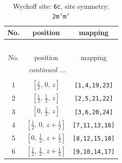 \documentclass[fleqn,8pt]{jsarticle}
\begin{document}
\renewcommand{\arraystretch}{1.2}
\begin{longtable}{ccc}
\caption{Wyckoff site: {\tt 6c}, site symmetry: {\tt 2m'm'}}
 \\
 \hline \hline
No. & position & mapping \\ \hline \endfirsthead

\multicolumn{2}{l}{\tablename\ \thetable{}} \\
 \hline \hline
No. & position & mapping \\ \hline \endhead

 \hline \hline
\multicolumn{2}{r}{\footnotesize\it continued ...} \\ \endfoot

 \hline \hline
\multicolumn{2}{r}{} \\ \endlastfoot

1 & $\left[ \frac{1}{2},\, 0,\, z \right]$ & {\tt [1,4,19,23]} \\ \hline
2 & $\left[ \frac{1}{2},\, \frac{1}{2},\, z \right]$ & {\tt [2,5,21,22]} \\ \hline
3 & $\left[ 0,\, \frac{1}{2},\, z \right]$ & {\tt [3,6,20,24]} \\ \hline
4 & $\left[ \frac{1}{2},\, 0,\, z + \frac{1}{2} \right]$ & {\tt [7,11,13,16]} \\ \hline
5 & $\left[ 0,\, \frac{1}{2},\, z + \frac{1}{2} \right]$ & {\tt [8,12,15,18]} \\ \hline
6 & $\left[ \frac{1}{2},\, \frac{1}{2},\, z + \frac{1}{2} \right]$ & {\tt [9,10,14,17]} \\
\end{longtable}
\renewcommand{\arraystretch}{1.2}
\end{document}
